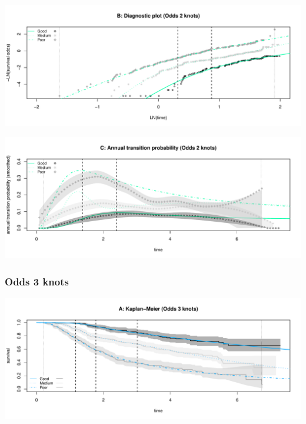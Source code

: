 \documentclass[
]{article}
\begin{document}
\begin{flushleft}\includegraphics[height=0.25\textheight]{BC_OS_output/Images/Figure_spline_models-14} \end{flushleft}

\begin{flushleft}\includegraphics[height=0.25\textheight]{BC_OS_output/Images/Figure_spline_models-15} \end{flushleft}

\clearpage

\subsubsection{Odds 3 knots}\label{odds-3-knots}

\begin{flushleft}\includegraphics[height=0.25\textheight]{BC_OS_output/Images/Figure_spline_models-16} \end{flushleft}
\end{document}
